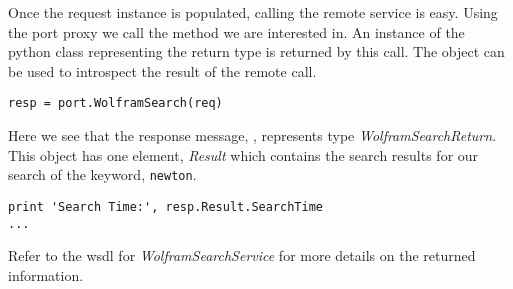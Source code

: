 Once the request instance is populated, calling the remote service is easy.  Using
the port proxy we call the method we are interested in.  An instance of the python
class representing the return type is returned by this call.  The  object
can be used to introspect the result of the remote call.

\begin{verbatim}
resp = port.WolframSearch(req)
\end{verbatim}

Here we see that the response message, , represents type {\it WolframSearchReturn}.
This object has one element, {\it Result} which contains the search results for our
search of the keyword, {\tt newton}.

\begin{verbatim}
print 'Search Time:', resp.Result.SearchTime
...
\end{verbatim}

Refer to the wsdl for {\it WolframSearchService} for more details on the returned information.